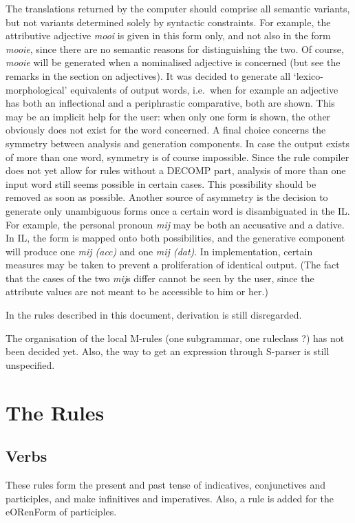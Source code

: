 The translations returned by the computer should comprise all semantic 
variants,
but not variants determined solely by syntactic constraints. For example, the 
attributive adjective {\em mooi} is given in this form only, and not also in 
the form {\em 
mooie}, since there are no semantic reasons for distinguishing the two. Of 
course, {\em mooie} will be generated when a nominalised adjective is concerned
(but see the remarks in the section on adjectives).
It was decided to generate all `lexico-morphological' equivalents of output 
words, i.e.\ 
when for example an adjective has both an inflectional and a periphrastic 
comparative, both are shown. This may be an implicit help for the user: when 
only one form is shown, the other obviously does not exist for the word 
concerned.
A final choice concerns the symmetry between analysis and generation components. 
In case the output exists of more than one word, symmetry is of course 
impossible. Since the rule compiler does not yet allow for rules without a 
DECOMP part, analysis of more than one input word still seems possible in 
certain cases. This possibility should be removed as soon as possible.
Another source of asymmetry is the decision to generate only 
unambiguous forms once a certain word is disambiguated in the IL. For example, 
the personal pronoun {\em mij\/} may be both an accusative and a dative. In IL, 
the form is mapped onto both possibilities, and the generative component will 
produce one {\em mij (acc)\/} and one {\em mij (dat)\/}. In implementation, certain 
measures may be taken to prevent a proliferation of identical output. (The fact 
that the cases of the two {\em mij\/}s differ cannot be seen by the user, since 
the attribute values are not meant to be accessible to him or her.)

In the rules described in this document, derivation is still disregarded.

The organisation of the local M-rules (one subgrammar, one ruleclass ?) has not 
been decided yet. Also, the way to get an expression through S-parser is still 
unspecified.

\section{The Rules}

\subsection{Verbs}

These rules form the present and past tense of indicatives, conjunctives and 
participles, and make infinitives and imperatives. Also, a rule is added for 
the eORenForm of participles.

